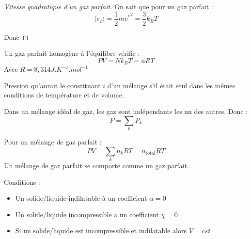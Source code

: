 \documentclass[12pt]{article}
\theoremstyle{cstyle}{\newtheorem{definition}{Définition}[section]}
\theoremstyle{cstyle}{\newtheorem{proposition}[definition]{Propriété}}
\theoremstyle{mystyle}{\newtheorem{theorem}[definition]{Théorème}}
\theoremstyle{mystyle}{\newtheorem{lemma}[definition]{Lemme}}
\theoremstyle{mystyle}{\newtheorem{corollary}[definition]{Corollaire}}
\theoremstyle{mystyle}{\newtheorem*{remark}{Remarque}}
\theoremstyle{mystyle}{\newtheorem*{remarks}{Remarques}}
\theoremstyle{mystyle}{\newtheorem*{example}{Exemple}}
\theoremstyle{mystyle}{\newtheorem*{examples}{Exemples}}
\theoremstyle{definition}{\newtheorem*{exercise}{Exercice}}
\theoremstyle{mystyle}{\newtheorem*{methode}{Méthode}}
\theoremstyle{cstyle}{\newtheorem*{cthm}{}}
\theoremstyle{warn}
\begin{document}
\newpage
\begin{minipage}[t]{0.45\textwidth}
	\begin{proof}[Vitesse quadratique d'un gaz parfait]
		On sait que pour un gaz parfait :
		\[
		\langle e_c \rangle = \frac{1}{2}m{v^*}^2 = \frac{3}{2} k_B T
		\]
		
		Donc 
	\end{proof}

	\begin{proposition}
		Un gaz parfait homogène à l'équilibre vérifie :
		\[PV = Nk_BT = nRT\]
		Avec $R = 8,314J.K^{-1}.mol^{-1}$ 
	\end{proposition}

	\begin{definition}
		Pression qu'aurait le constituant $i$ d'un mélange s'il était seul dans les mêmes conditions de température et de volume.
	\end{definition}
	\begin{proposition}
		Dans un mélange idéal de gaz, les gaz sont indépendants les un des autres. Donc :
		\[
			P = \sum_k P_k
		\]
	\end{proposition}

	\begin{proposition}
		Pour un mélange de gaz parfait :
		\[
			PV = \sum_k n_kRT = n_{\text{total}}RT
		\]
		Un mélange de gaz parfait se comporte comme un gaz parfait.
	\end{proposition}
\end{minipage}
\hfill
\begin{minipage}[t]{0.45\textwidth}
	\begin{proposition}
		Conditions :
		\begin{itemize}
			\item Un solide/liquide indilatable à un coefficient $\alpha = 0$
			\item Un solide/liquide incompressible a un coefficient $\chi = 0$
			\item Si un solide/liquide est incompressible et indilatable alors $V = cst$
		\end{itemize}
	\end{proposition}
\end{minipage}
\end{document}
